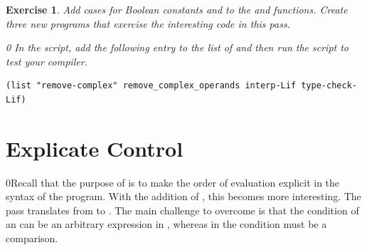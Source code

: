 \documentclass[7x10]{TimesAPriori_MIT}%
\def\racketEd{0}
\def\edition{1}
\newcommand{\racket}[1]{{\if\edition\racketEd{#1}\fi}}
\newtheorem{exercise}[theorem]{Exercise}
\numberwithin{theorem}{chapter}
\numberwithin{definition}{chapter}
\numberwithin{equation}{chapter}
\begin{document}
\begin{exercise}\normalfont\normalsize
%
Add cases for Boolean constants and  to the 
and  functions.
%
Create three new \LangIf{} programs that exercise the interesting
code in this pass.
%
{\if\edition\racketEd    
In the  script, add the following entry to the
list of  and then run the script to test your compiler.
\begin{lstlisting}
(list "remove-complex" remove_complex_operands interp-Lif type-check-Lif)
\end{lstlisting}
\fi}
\end{exercise}


\section{Explicate Control}
\label{sec:explicate-control-Lif}

\racket{Recall that the purpose of  is to
  make the order of evaluation explicit in the syntax of the program.
  With the addition of \key{if}, this becomes more interesting.}
%
The  pass translates from \LangIf{} to \LangCIf{}.
%
The main challenge to overcome is that the condition of an 
can be an arbitrary expression in \LangIf{}, whereas in \LangCIf{} the
condition must be a comparison.
\end{document}
